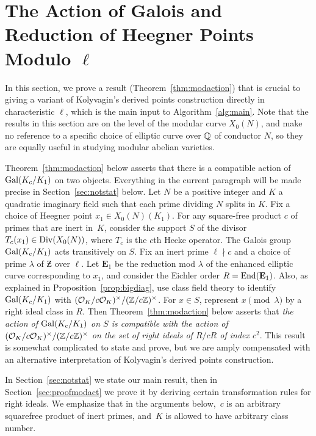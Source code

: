 \documentclass{article} \usepackage[active]{srcltx}
\newcommand{\eE}{\mathbf{E}}
\newcommand{\OK}{\mathcal{O}_K}
\begin{document}
\section{The Action of Galois and 
Reduction of Heegner Points Modulo $\ell$}\label{sec:galois}

In this section, we prove a result (Theorem~\ref{thm:modaction}) that
is crucial to giving a variant of Kolyvagin's derived points
construction directly in characteristic $\ell$, which is the main input
to Algorithm~\ref{alg:main}.  Note that the results in this section
are on the level of the modular curve $X_0(N)$, and make no reference
to a specific choice of elliptic curve over $\mathbb{Q}$ of conductor $N$, so
they are equally useful in studying modular abelian varieties.

Theorem~\ref{thm:modaction} below asserts that there is a compatible
action of $\operatorname{Gal}(K_c/K_1)$ on two objects.  Everything in the current
paragraph will be made precise in Section~\ref{sec:notstat} below.
Let $N$ be a positive integer and $K$ a quadratic imaginary field such
that each prime dividing $N$ splits in $K$.  Fix a choice of Heegner
point $x_1 \in X_0(N)(K_1)$.  For any square-free product $c$ of
primes that are inert in~$K$, consider the support $S$ of the divisor
$T_c(x_1) \in \operatorname{Div}(X_0(N))$, where $T_c$ is the $c$th Hecke operator.
The Galois group $\operatorname{Gal}(K_c/K_1)$ acts transitively on $S$.  Fix an
inert prime $\ell\nmid c$ and a choice of prime $\lambda$ of $\Zbar$
over $\ell$.
Let $\eE_1$ be the reduction mod $\lambda$ of the enhanced elliptic
curve corresponding to $x_1$, and consider the Eichler order
$R=\End(\eE_1)$.  Also, as explained in
Proposition~\ref{prop:bigdiag}, use class field theory to identify
$\operatorname{Gal}(K_c/K_1)$ with $(\OK/c\OK)^{\times}/(\Z/c\Z)^{\times}$.  For $x
\in S$, represent $x\pmod{\lambda}$ by a right ideal class in $R$.
Then Theorem~\ref{thm:modaction} below asserts that {\em the action of
  $\operatorname{Gal}(K_c/K_1)$ on $S$ is compatible with the action of
  $(\OK/c\OK)^{\times}/(\Z/c\Z)^{\times}$ on the set of right ideals
  of $R/cR$ of index $c^2$}.  This result is somewhat complicated to
state and prove, but we are amply compensated with an alternative
interpretation of Kolyvagin's derived points construction.

In Section~\ref{sec:notstat} we state our main result, then in
Section~\ref{sec:proofmodact} we prove it by deriving certain
transformation rules for right ideals.  We emphasize that in the
arguments below,~$c$ is an arbitrary squarefree product of inert
primes, and~$K$ is allowed to have arbitrary class number.
\end{document}
